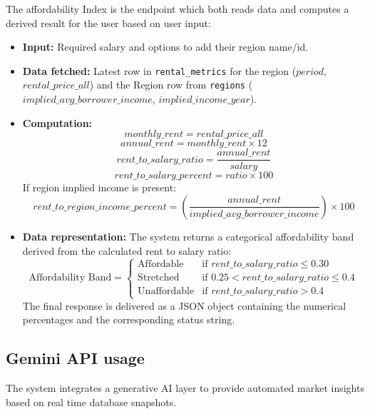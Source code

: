 \documentclass[11pt,a4paper]{article}
\begin{document}
The affordability Index is the endpoint which both reads data and computes a derived result for the user based on user input:
\begin{itemize}[nosep]
    \item \textbf{Input:} Required salary and options to add their region name/id.
    \item \textbf{Data fetched:} Latest row in \texttt{rental\_metrics} for the region ($period$, $rental\_price\_all$) and the Region row from \texttt{regions} ($implied\_avg\_borrower\_income$, $implied\_income\_year$).
    \item \textbf{Computation:} 
        \[ monthly\_rent = rental\_price\_all \]
        \[ annual\_rent = monthly\_rent \times 12 \]
        \[ rent\_to\_salary\_ratio = \frac{annual\_rent}{salary} \]
        \[ rent\_to\_salary\_percent = ratio \times 100 \]
        If region implied income is present:
        \[ rent\_to\_region\_income\_percent = \left( \frac{annual\_rent}{implied\_avg\_borrower\_income} \right) \times 100 \]
    \item \textbf{Data representation:} The system returns a categorical affordability band derived from the calculated rent to salary ratio:
        \[
        \text{Affordability Band} = 
        \begin{cases} 
        \text{Affordable} & \text{if } rent\_to\_salary\_ratio \le 0.30 \\
        \text{Stretched} & \text{if } 0.25 < rent\_to\_salary\_ratio \le 0.4 \\
        \text{Unaffordable} & \text{if } rent\_to\_salary\_ratio > 0.4
        \end{cases}
        \]
        The final response is delivered as a JSON object containing the numerical percentages and the corresponding status string.
\end{itemize}

\subsection{Gemini API usage}

The system integrates a generative AI layer to provide automated market insights based on real time database snapshots.
\end{document}
